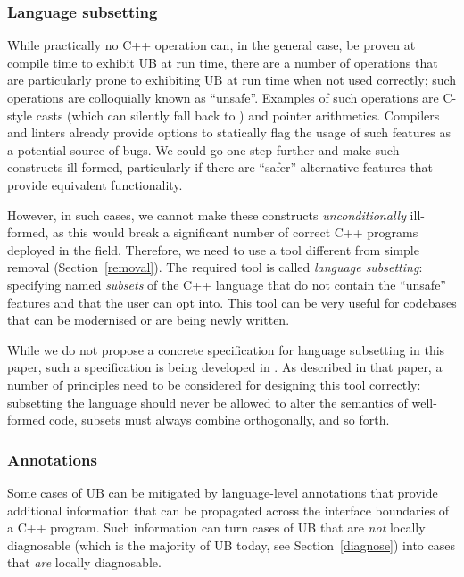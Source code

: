 \subsubsection{Language subsetting}
\label{subsetting}

While practically no C++ operation can, in the general case, be proven at compile time to exhibit UB at run time, there are a number of operations that are particularly prone to exhibiting UB at run time when not used correctly; such operations are colloquially known as ``unsafe''. Examples of such operations are C-style casts (which can silently fall back to ) and pointer arithmetics. Compilers and linters already provide options to statically flag the usage of such features as a potential source of bugs. We could go one step further and make such constructs ill-formed, particularly if there are ``safer'' alternative features that provide equivalent functionality. 

However, in such cases, we cannot make these constructs \emph{unconditionally} ill-formed, as this would break a significant number of correct C++ programs deployed in the field. Therefore, we need to use a tool different from simple removal (Section~\ref{removal}). The required tool is called \emph{language subsetting}: specifying named \emph{subsets} of the C++ language that do not contain the ``unsafe'' features and that the user can opt into. This tool can be very useful for codebases that can be modernised or are being newly written.

While we do not propose a concrete specification for language subsetting in this paper, such a specification is being developed in \cite{P3716R0}. As described in that paper, a number of principles need to be considered for designing this tool correctly: subsetting the language should never be allowed to alter the semantics of well-formed code, subsets must always combine orthogonally, and so forth. 

\subsubsection{Annotations}
\label{annotations}

Some cases of UB can be mitigated by language-level annotations that provide additional information that can be propagated across the interface boundaries of a C++ program. Such information can turn cases of UB that are \emph{not} locally diagnosable (which is the majority of UB today, see Section~\ref{diagnose}) into cases that \emph{are} locally diagnosable.

